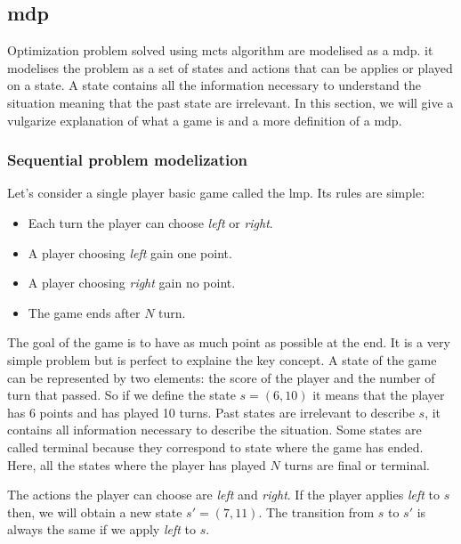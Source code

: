\subsection{\acrlong{mdp}}%
\label{sub:mdp}

Optimization problem solved using \gls{mcts} algorithm are modelised as a \gls{mdp}.
it modelises the problem as a set of states and actions that can be applies or played on a state.
A state contains all the information necessary to understand the situation meaning that the past state are irrelevant.
In this section, we will give a vulgarize explanation of what a game is and a more definition of a \gls{mdp}.

\subsubsection{Sequential problem modelization}%
\label{ssub:sequential_problem_modelization}

Let's consider a single player basic game called the \gls{lmp}.
Its rules are simple:

\begin{itemize}
    \item Each turn the player can choose \textit{left}  or \textit{right}.
    \item A player choosing \textit{left} gain one point.
    \item A player choosing \textit{right} gain no point.
    \item The game ends after \(N\) turn.
\end{itemize}

The goal of the game is to have as much point as possible at the end.
It is a very simple problem but is perfect to explaine the key concept.
A state of the game can be represented by two elements: the score of the player and the number of turn that passed.
So if we define the state \(s=(6, 10)\) it means that the player has 6 points and has played 10 turns.
Past states are irrelevant to describe \(s\), it contains all information necessary to describe the situation.
Some states are called terminal because they correspond to state where the game has ended.
Here, all the states where the player has played \(N\) turns are final or terminal.

The actions the player can choose are \textit{left} and \textit{right}.
If the player applies \textit{left}  to \(s\) then, we will obtain a new state \(s'=(7, 11)\).
The transition from \(s\) to \(s'\) is always the same if we apply \textit{left} to \(s\).

